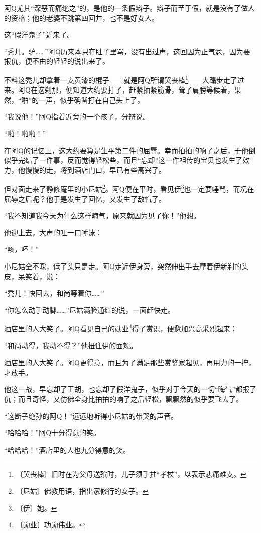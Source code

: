 \documentclass[12pt,UTF-8,openany]{ctexbook}
\begin{document}
\begin{normalsize}
    阿Q尤其“深恶而痛绝之”的，是他的一条假辫子。辫子而至于假，就是没有了做人的资格；他的老婆不跳第四回井，也不是好女人。
    
    这“假洋鬼子”近来了。
    
    “秃儿。驴……”阿Q历来本只在肚子里骂，没有出过声，这回因为正气忿，因为要报仇，便不由的轻轻的说出来了。
    
    不料这秃儿却拿着一支黄漆的棍子——就是阿Q所谓哭丧棒\footnote{〔哭丧棒〕旧时在为父母送殡时，儿子须手拄“孝杖”，以表示悲痛难支。}——大蹋步走了过来。阿Q在这刹那，便知道大约要打了，赶紧抽紧筋骨，耸了肩膀等候着，果然，“啪”的一声，似乎确凿打在自己头上了。
    
    “我说他！”阿Q指着近旁的一个孩子，分辩说。
    
    “啪！啪啪！”
    
    在阿Q的记忆上，这大约要算是生平第二件的屈辱。幸而拍拍的响了之后，于他倒似乎完结了一件事，反而觉得轻松些，而且“忘却”这一件祖传的宝贝也发生了效力，他慢慢的走，将到酒店门口，早已有些高兴了。
    
    但对面走来了静修庵里的小尼姑\footnote{〔尼姑〕佛教用语，指出家修行的女子。}。阿Q便在平时，看见伊\footnote{〔伊〕她。}也一定要唾骂，而况在屈辱之后呢？他于是发生了回忆，又发生了敌忾了。
    
    “我不知道我今天为什么这样晦气，原来就因为见了你！”他想。
    
    他迎上去，大声的吐一口唾沫：
    
    “咳，呸！”
    
    小尼姑全不睬，低了头只是走。阿Q走近伊身旁，突然伸出手去摩着伊新剃的头皮，呆笑着，说：
    
    “秃儿！快回去，和尚等着你……”
    
    “你怎么动手动脚……”尼姑满脸通红的说，一面赶快走。
    
    酒店里的人大笑了。阿Q看见自己的勋业\footnote{〔勋业〕功勋伟业。}得了赏识，便愈加兴高采烈起来：
    
    “和尚动得，我动不得？”他扭住伊的面颊。
    
    酒店里的人大笑了。阿Q更得意，而且为了满足那些赏鉴家起见，再用力的一拧，才放手。
    
    他这一战，早忘却了王胡，也忘却了假洋鬼子，似乎对于今天的一切“晦气”都报了仇；而且奇怪，又仿佛全身比拍拍的响了之后轻松，飘飘然的似乎要飞去了。
    
    “这断子绝孙的阿Q！”远远地听得小尼姑的带哭的声音。
    
    “哈哈哈！”阿Q十分得意的笑。
    
    “哈哈哈！”酒店里的人也九分得意的笑。
    
\end{normalsize}
\end{document}
